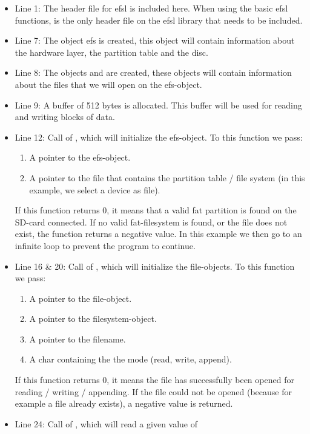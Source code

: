 \begin{itemize}
	\item{Line 1: The header file for efsl is included here. When using the
		basic efsl functions,  is the only header file on the 
		efsl library that needs to be included.}
	\item{Line 7: The object efs is created, this object will contain
		information about the hardware layer, the partition table and
		the disc.}
	\item{Line 8: The objects  and  are created, these objects 
		will contain information about the files that we will open on the 
		efs-object.}
	\item{Line 9: A buffer of 512 bytes is allocated. This buffer will be
		used for reading and writing blocks of data.}
	\item{Line 12: Call of , which will initialize the efs-object.
		To this function we pass:
		\begin{enumerate}
			\item{A pointer to the efs-object.}
			\item{A pointer to the file that contains the partition table /
				file system (in this example, we select a device as file).}
		\end{enumerate}
		If this function returns 0, it means that a valid fat partition is
		found on the SD-card connected.
		If no valid fat-filesystem is found, or the file does not exist, the
		function returns a negative value. In this example we then go to an
		infinite loop to prevent the program to continue.}
	\item{Line 16 \& 20: Call of , which will initialize the
		file-objects. To this function we pass:
		\begin{enumerate}
			\item{A pointer to the file-object.}
			\item{A pointer to the filesystem-object.}
			\item{A pointer to the filename.}
			\item{A char containing the the mode (read, write, append).}
		\end{enumerate}
		If this function returns 0, it means the file has successfully been
		opened for reading / writing / appending.
	 	If the file could not be opened (because for example a file already 
		exists), a negative value is returned.}
	\item{Line 24: Call of , which will read a given value of
}
\end{itemize}
